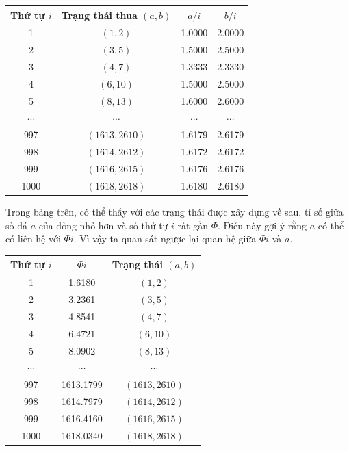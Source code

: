 \documentclass[11pt]{article}
\begin{document}
\begin{center}
\begin{tabular}{c|c|c|c}
\textbf{Thứ tự \(i\)} & \textbf{Trạng thái thua \((a,b)\)} &
\textbf{\(a/i\)} & \textbf{\(b/i\)} \\
\hline
1 & \((1,2)\) & 1.0000 & 2.0000 \\
2 & \((3,5)\) & 1.5000 & 2.5000 \\
3 & \((4,7)\) & 1.3333 & 2.3330 \\
4 & \((6,10)\) & 1.5000 & 2.5000 \\
5 & \((8,13)\) & 1.6000 & 2.6000 \\
\(\cdots\) & \(\cdots\) & \(\cdots\) & \(\cdots\) \\
997 & \((1613,2610)\) & 1.6179 & 2.6179 \\
998 & \((1614,2612)\) & 1.6172 & 2.6172 \\
999 & \((1616,2615)\) & 1.6176 & 2.6176 \\
1000 & \((1618,2618)\) & 1.6180 & 2.6180 \\
\end{tabular}
\end{center}

Trong bảng trên, có thể thấy với các trạng thái được xây dựng về sau, tỉ số
giữa số đá \(a\) của đống nhỏ hơn và số thứ tự \(i\) rất gần \(\Phi\). Điều
này gợi ý rằng \(a\) có thể có liên hệ với \(\Phi i\). Vì vậy ta quan sát
ngược lại quan hệ giữa \(\Phi i\) và \(a\).

\begin{center}
\begin{tabular}{c|c|c}
\textbf{Thứ tự \(i\)} & \textbf{\(\Phi i\)} &
\textbf{Trạng thái \((a,b)\)} \\
\hline
1 & 1.6180 & \((1,2)\) \\
2 & 3.2361 & \((3,5)\) \\
3 & 4.8541 & \((4,7)\) \\
4 & 6.4721 & \((6,10)\) \\
5 & 8.0902 & \((8,13)\) \\
\(\cdots\) & \(\cdots\) & \(\cdots\) \\
997 & 1613.1799 & \((1613,2610)\) \\
998 & 1614.7979 & \((1614,2612)\) \\
999 & 1616.4160 & \((1616,2615)\) \\
1000 & 1618.0340 & \((1618,2618)\) \\
\end{tabular}
\end{center}
\end{document}
